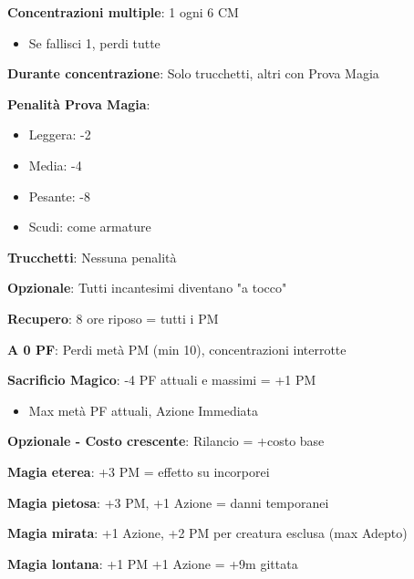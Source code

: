 \documentclass[10pt,a4paper,landscape]{article}
\begin{document}
\begin{multicols}{3}
\begin{tcolorbox}[title=CONCENTRAZIONE]
			\textbf{Concentrazioni multiple}: 1 ogni 6 CM
			\begin{itemize}[leftmargin=*,noitemsep]
				\item Se fallisci 1, perdi tutte
			\end{itemize}
			
			\textbf{Durante concentrazione}: Solo trucchetti, altri con Prova Magia
		\end{tcolorbox}
		
		\begin{tcolorbox}[title=ARMATURE E MAGIA]
			\textbf{Penalità Prova Magia}:
			\begin{itemize}[leftmargin=*,noitemsep]
				\item Leggera: -2
				\item Media: -4  
				\item Pesante: -8
				\item Scudi: come armature
			\end{itemize}
			
			\textbf{Trucchetti}: Nessuna penalità
			
			\textbf{Opzionale}: Tutti incantesimi diventano "a tocco"
		\end{tcolorbox}
		
		\begin{tcolorbox}[title=GESTIONE PUNTI MAGIA]
			\textbf{Recupero}: 8 ore riposo = tutti i PM
			
			\textbf{A 0 PF}: Perdi metà PM (min 10), concentrazioni interrotte
			
			\textbf{Sacrificio Magico}: -4 PF attuali e massimi = +1 PM
			\begin{itemize}[leftmargin=*,noitemsep]
				\item Max metà PF attuali, Azione Immediata
			\end{itemize}
			
			\textbf{Opzionale - Costo crescente}: Rilancio = +costo base
		\end{tcolorbox}
		
		\begin{tcolorbox}[title=ALTERAZIONI MAGIA]
			\textbf{Magia eterea}: +3 PM = effetto su incorporei
			
			\textbf{Magia pietosa}: +3 PM, +1 Azione = danni temporanei
			
			\textbf{Magia mirata}: +1 Azione, +2 PM per creatura esclusa (max Adepto)
			
			\textbf{Magia lontana}: +1 PM +1 Azione = +9m gittata
			

\end{tcolorbox}
\end{multicols}
\end{document}
